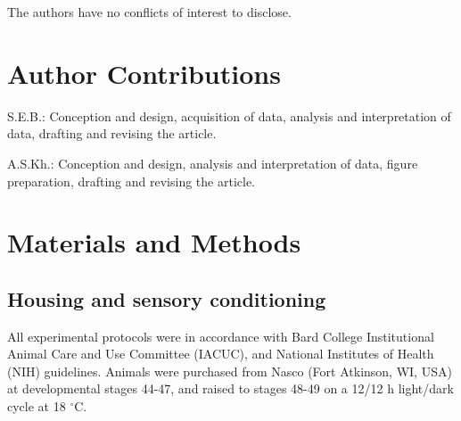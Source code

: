 \documentclass{article}
\begin{document}
The authors have no conflicts of interest to disclose.

\section*{Author Contributions}

S.E.B.: Conception and design, acquisition of data, analysis and interpretation of data, drafting and revising the article. 

A.S.Kh.: Conception and design, analysis and interpretation of data, figure preparation, drafting and revising the article.

\section*{Materials and Methods}

\subsection*{Housing and sensory conditioning}

All experimental protocols were in accordance with Bard College Institutional Animal Care and Use Committee (IACUC), and National Institutes of Health (NIH) guidelines. Animals were purchased from Nasco (Fort Atkinson, WI, USA) at developmental stages 44-47, and raised to stages 48-49 on a 12/12 h light/dark cycle at 18 $^{\circ}$C. 
\end{document}
